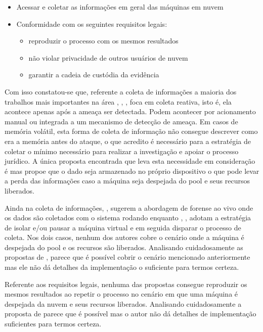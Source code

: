 \documentclass[12pt,				%
	openright,			%
	oneside,			%
	a4paper,			%
	english,			%
	brazil				%
	]{abntex2}
\begin{document}
\begin{itemize}
 \item Acessar e coletar as informações em geral das máquinas em nuvem
 \item Conformidade com os seguintes requisitos legais: 
 \begin{itemize}
  \item reproduzir o processo com os mesmos resultados
  \item não violar privacidade de outros usuários de nuvem
  \item garantir a cadeia de custódia da evidência
 \end{itemize}
\end{itemize}

Com isso constatou-se que, referente a coleta de informações a maioria dos trabalhos mais importantes na área \cite{Reichert2015}, \cite{Poisel2013}, \cite{Dykstra2013}, \cite{George2012}
\cite{Sang2013} foca em coleta reativa, isto é, ela acontece apenas após a ameaça ser detectada. Podem acontecer por acionamento manual ou integrada a um mecanismo de detecção de ameaça. 
Em casos de memória volátil, esta forma de coleta de informação não consegue descrever como era a memória antes do ataque, o que acredito é necessário para a estratégia de 
coletar o mínimo necessário para realizar a investigação e apoiar o processo jurídico. A única proposta encontrada que leva esta necessidade em consideração é \cite{Dezfouli2012} mas
propoe que o dado seja armazenado no próprio dispositivo o que pode levar a perda das informações caso a máquina seja despejada do pool e seus recursos liberados.

Ainda na coleta de informações, \cite{Reichert2015}, \cite{George2012} sugerem a abordagem de forense ao vivo onde os dados são coletados com o sistema rodando enquanto 
\cite{Poisel2013}, \cite{Dykstra2013}, \cite{Sang2013} adotam a estratégia de isolar e/ou pausar a máquina virtual e em seguida disparar o processo de coleta. Nos dois casos, 
nenhum dos autores cobre o cenário onde a máquina é despejada do pool e os recursos são liberados. Analisando cuidadosamente as propostas de \cite{Poisel2013}, parece que é possível
cobrir o cenário mencionado anteriormente mas ele não dá detalhes da implementação o suficiente para termos certeza.

Referente aos requisitos legais, nenhuma das propostas consegue reproduzir os mesmos resultados ao repetir o processo no cenário em que uma máquina é despejada da nuvem e seus 
recursos liberados. Analisando cuidadosamente a proposta de \cite{George2012} parece que é possível mas o autor não dá detalhes de implementação suficientes para termos certeza.
\end{document}
